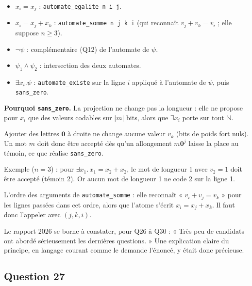 \documentclass[11pt,a4paper]{article}
\providecommand{\tightlist}{\setlength{\itemsep}{0pt}\setlength{\parskip}{0pt}}
\begin{document}
\begin{itemize}
\tightlist
\item
  \textbf{\(x_i=x_j\)} : \texttt{automate\_egalite\ n\ i\ j}.
\item
  \textbf{\(x_i=x_j+x_k\)} : \texttt{automate\_somme\ n\ j\ k\ i} (qui reconnaît \(v_j+v_k=v_i\) ; elle suppose \(n\ge3\)).
\item
  \textbf{\(\neg\psi\)} : complémentaire (Q12) de l'automate de \(\psi\).
\item
  \textbf{\(\psi_1\wedge\psi_2\)} : intersection des deux automates.
\item
  \textbf{\(\exists x_i.\psi\)} : \texttt{automate\_existe} sur la ligne \(i\) appliqué à l'automate de \(\psi\), puis \texttt{sans\_zero}.
\end{itemize}

\textbf{Pourquoi \texttt{sans\_zero}.} La projection ne change pas la longueur : elle ne propose pour \(x_i\) que des valeurs codables sur \(|m|\) bits, alors que \(\exists x_i\) porte sur tout \(\mathbb{N}\).

Ajouter des lettres \(\mathbf{0}\) à droite ne change aucune valeur \(v_k\) (bits de poids fort nuls). Un mot \(m\) doit donc être accepté dès qu'un allongement \(m{\mathbf{0}}^j\) laisse la place au témoin, ce que réalise \texttt{sans\_zero}.

Exemple (\(n=3\)) : pour \(\exists x_1.\,x_1=x_2+x_2\), le mot de longueur 1 avec \(v_2=1\) doit être accepté (témoin 2). Or aucun mot de longueur 1 ne code 2 sur la ligne 1.

\begin{piege}

L'ordre des arguments de \texttt{automate\_somme} : elle reconnaît « \(v_i+v_j=v_k\) » pour les lignes passées dans cet ordre, alors que l'atome s'écrit \(x_i=x_j+x_k\). Il faut donc l'appeler avec \((j,k,i)\).

\end{piege}

\begin{jury}

Le rapport 2026 se borne à constater, pour Q26 à Q30 : « Très peu de candidats ont abordé sérieusement les dernières questions. » Une explication claire du principe, en langage courant comme le demande l'énoncé, y était donc précieuse.

\end{jury}

\hypertarget{question-27}{%
\subsection{Question 27}\label{question-27}}
\end{document}
